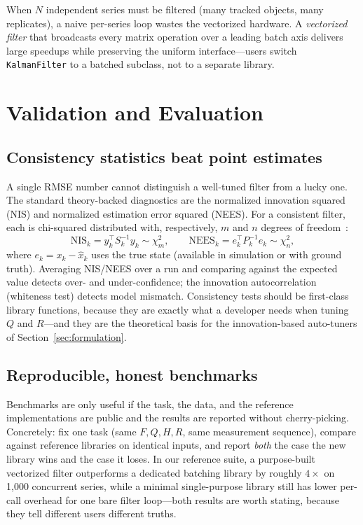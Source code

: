 \documentclass[10pt,conference]{IEEEtran}
\begin{document}
When $N$ independent series must be filtered (many tracked objects, many
replicates), a naive per-series loop wastes the vectorized hardware.
A \emph{vectorized filter} that broadcasts every matrix operation over a
leading batch axis delivers large speedups while preserving the uniform
interface---users switch \texttt{KalmanFilter} to a batched subclass, not to a
separate library.

\section{Validation and Evaluation}
\label{sec:validation}

\subsection{Consistency statistics beat point estimates}

A single RMSE number cannot distinguish a well-tuned filter from a lucky one.
The standard theory-backed diagnostics are the normalized innovation squared
(NIS) and normalized estimation error squared (NEES). For a consistent
filter, each is chi-squared distributed with, respectively, $m$ and $n$
degrees of freedom~\cite{bar2011estimation}:
\begin{equation}
\mathrm{NIS}_k = y_k^{\top} S_k^{-1} y_k \sim \chi^2_m, \qquad
\mathrm{NEES}_k = e_k^{\top} P_k^{-1} e_k \sim \chi^2_n,
\end{equation}
where $e_k = x_k - \hat{x}_k$ uses the true state (available in simulation or
with ground truth). Averaging NIS/NEES over a run and comparing against the
expected value detects over- and under-confidence; the innovation
autocorrelation (whiteness test) detects model mismatch. Consistency tests
should be first-class library functions, because they are exactly what a
developer needs when tuning $Q$ and $R$---and they are the theoretical basis
for the innovation-based auto-tuners of Section~\ref{sec:formulation}.

\subsection{Reproducible, honest benchmarks}

Benchmarks are only useful if the task, the data, and the reference
implementations are public and the results are reported without cherry-picking.
Concretely: fix one task (same $F,Q,H,R$, same measurement sequence), compare
against reference libraries on identical inputs, and report \emph{both} the
case the new library wins and the case it loses. In our reference suite, a
purpose-built vectorized filter outperforms a dedicated batching library by
roughly $4\times$ on 1{,}000 concurrent series, while a minimal single-purpose
library still has lower per-call overhead for one bare filter loop---both
results are worth stating, because they tell different users different truths.
\end{document}
